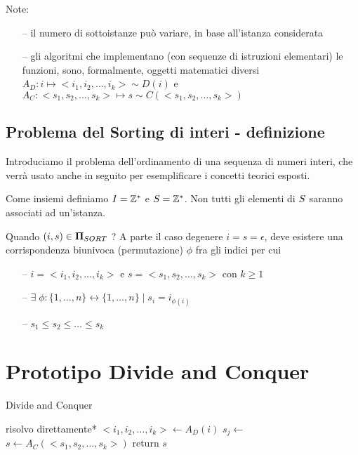 Note:
\begin{itemize}[noitemsep,parsep=0pt,partopsep=0pt]
    \item[--] il numero di sottoistanze può variare, in base all'istanza considerata
    \item[--] gli algoritmi che implementano (con sequenze di istruzioni elementari) le funzioni, sono, formalmente, oggetti matematici diversi \\
        $ A_D : i \mapsto <i_1, i_2, \dots, i_k> \sim D(i)$ e $ A_C : <s_1, s_2, \dots, s_k> \mapsto s \sim C(<s_1, s_2, \dots, s_k>) $
\end{itemize}

\subsection{Problema del Sorting di interi - definizione}

Introduciamo il problema dell'ordinamento di una sequenza di numeri interi, che verrà usato anche in seguito per esemplificare i concetti teorici esposti.

Come insiemi definiamo $I{} = \mathbb{Z}^* $ e $S{} = \mathbb{Z}^* $. Non tutti gli elementi di $S{}$ saranno associati ad un'istanza.

Quando $ (i,s) \in \bm{\Pi}{}_{SORT} $ ? A parte il caso degenere $i=s=\epsilon$, deve esistere una corrispondenza biunivoca (permutazione) $\phi$ fra gli indici per cui
\begin{itemize}[noitemsep,parsep=0pt,partopsep=0pt]
    \item[--] $i = <i_1, i_2, \dots, i_k> $ e $ s = <s_1, s_2, \dots, s_k> $ con $k \geq 1$
    \item[--] $ \exists \;\phi:\{1, \dots, n\} \leftrightarrow \{1, \dots, n\} \;|\; s_i = i_{\phi(i)}$
    \item[--] $ s_1 \leq s_2 \leq \dots \leq s_k$ 
\end{itemize}

\section{Prototipo Divide and Conquer}

\begin{algorithm}[H]
\caption{Divide and Conquer}\label{alg:dnc}
\begin{algorithmic}[1]
                                     
            \State *risolvo direttamente*
        \EndIf
        \State $<i_1, i_2, \dots, i_k> \gets A_D(i)$    
                            
            \State $s_j \gets $ 
        \EndFor
        \State $s \gets A_C(<s_1, s_2, \dots, s_k>)$    
        \State return $s$
    \EndProcedure
\end{algorithmic}
\end{algorithm}

